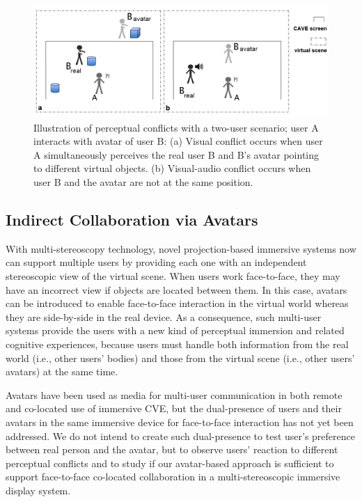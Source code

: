 \begin{figure}[tb]
  \centering
  \includegraphics[width=\textwidth]{figures/2_inconsistency}
  \caption{\label{fig:2_inconsistency}Illustration of perceptual conflicts with a two-user scenario; user A interacts with avatar of user B: (a) Visual conflict occurs when user A simultaneously perceives the real user B and B's avatar pointing to different virtual objects. (b) Visual-audio conflict occurs when user B and the avatar are not at the same position.}
\end{figure}


\subsection{Indirect Collaboration via Avatars}
With multi-stereoscopy technology, novel projection-based immersive systems now can support multiple users by providing each one with an independent stereoscopic view of the virtual scene. When users work face-to-face, they may have an incorrect view if objects are located between them. In this case, avatars can be introduced to enable face-to-face interaction in the virtual world whereas they are side-by-side in the real device. As a consequence, such multi-user systems provide the users with a new kind of perceptual immersion and related cognitive experiences, because users must handle both information from the real world (i.e., other users' bodies) and those from the virtual scene (i.e., other users' avatars) at the same time.

Avatars have been used as media for multi-user communication in both remote and co-located use of immersive CVE, but the dual-presence of users and their avatars in the same immersive device for face-to-face interaction has not yet been addressed. We do not intend to create such dual-presence to test user's preference between real person and the avatar, but to observe users' reaction to different perceptual conflicts and to study if our avatar-based approach is sufficient to support face-to-face co-located collaboration in a multi-stereoscopic immersive display system.

